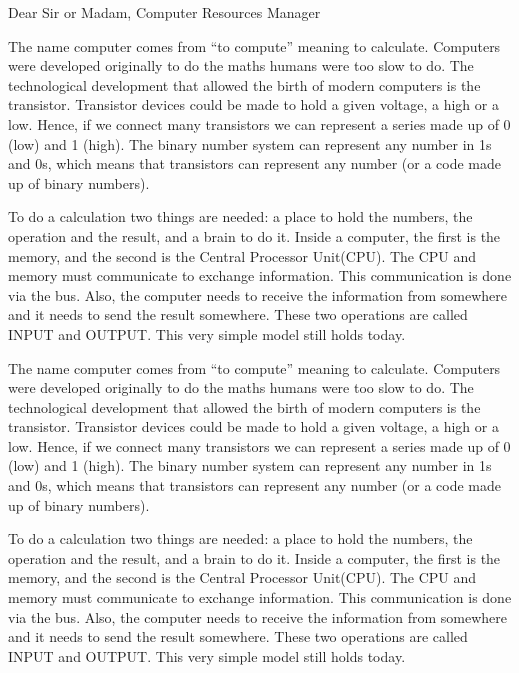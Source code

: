 \documentclass[blank]{impletter}
\author{Letty Foulkes}
\begin{document}
{
Dear Sir or Madam,
}
{
Computer Resources Manager\\
}
\informal

The name computer comes from ``to compute'' meaning to
calculate. Computers were developed originally to do the maths humans
were too slow to do. The technological development that allowed the
birth of modern computers is the transistor. Transistor devices could
be made to hold a given voltage, a high or a low. Hence, if we connect
many transistors we can represent a series made up of 0 (low) and 1
(high). The binary number system can represent any number in 1s and
0s, which means that transistors can represent any number (or a code
made up of binary numbers).

To do a calculation two things are needed: a place to hold the
numbers, the operation and the result, and a brain to do it. Inside a
computer, the first is the memory, and the second is the Central
Processor Unit(CPU). The CPU and memory must communicate to exchange
information. This communication is done via the bus. Also, the
computer needs to receive the information from somewhere and it needs
to send the result somewhere. These two operations are called INPUT
and OUTPUT. This very simple model still holds today.

The name computer comes from ``to compute'' meaning to
calculate. Computers were developed originally to do the maths humans
were too slow to do. The technological development that allowed the
birth of modern computers is the transistor. Transistor devices could
be made to hold a given voltage, a high or a low. Hence, if we connect
many transistors we can represent a series made up of 0 (low) and 1
(high). The binary number system can represent any number in 1s and
0s, which means that transistors can represent any number (or a code
made up of binary numbers).

To do a calculation two things are needed: a place to hold the
numbers, the operation and the result, and a brain to do it. Inside a
computer, the first is the memory, and the second is the Central
Processor Unit(CPU). The CPU and memory must communicate to exchange
information. This communication is done via the bus. Also, the
computer needs to receive the information from somewhere and it needs
to send the result somewhere. These two operations are called INPUT
and OUTPUT. This very simple model still holds today.
\end{document}
